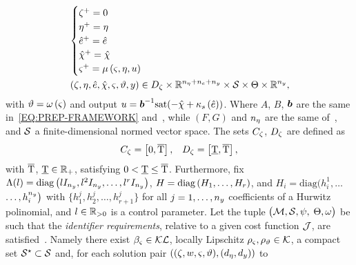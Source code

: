 \begin{equation*}
   \begin{split}
      &
      \begin{cases}
         \zeta^{+} = 0 \\
         \eta^{+} = \eta \\
         \hat{e}^{+} = \hat{e} \\
         \hat{\chi}^{+} = \hat{\chi}\\
         \varsigma^{+} = \mu \left( \varsigma, \eta, u \right)
      \end{cases} \\
      & \left( \zeta, \eta, \hat{e}, \hat{\chi}, \varsigma, \vartheta, y \right) \in D_{\zeta} \times \mathbb{R}^{n_{\eta} + n_{e} + n_{y}} \times \mathcal{S} \times \Theta \times \mathbb{R}^{n_{y}},
   \end{split}
\end{equation*}
with $\vartheta = \omega \left( \varsigma \right)$ and output $u = \boldsymbol{b}^{-1}\text{sat}(-\hat{\chi} + \kappa_s \left( \hat{e} \right))$.
Where $A$, $B$, $\boldsymbol{b}$ are the same in~\eqref{EQ:PREP-FRAMEWORK} and~,
while $(F,G)$ and $n_{\eta}$ are the same of~, and
$\mathcal{S}$ a finite-dimensional normed vector space. The sets $C_{\zeta}$, $D_{\zeta}$ are defined as
\begin{equation*}
   \begin{matrix}
      C_{\zeta} = \left[ 0, \overline{\text{T}} \right], &
      D_{\zeta} = \left[ \underline{\text{T}}, \overline{\text{T}} \right],
   \end{matrix}
\end{equation*}
with $\overline{\text{T}}$, $\underline{\text{T}} \in \mathbb{R}_{+}$, satisfying $0 < \underline{\text{T}} \le \overline{\text{T}}$.
Furthermore, fix $\Lambda(l) = \text{diag} \left( l I_{n_{y}}, l^{2} I_{n_{y}}, \dots, l^{r} I_{n_{y}} \right)$,
$H = \text{diag} \left( H_1, \dots, H_r \right)$, and $H_i = \text{diag} \big( h^1_i, \dots$ $\dots, h^{n_{y}}_i \big)$ with
$\{h_{1}^j, h_{2}^j, \dots, h_{r+1}^j\}$ for all $j = 1, \dots, n_{y}$ coefficients of a Hurwitz polinomial,
and $l \in \mathbb{R}_{>0}$ is a control parameter.
Let the tuple $\big(\mathcal{M}, \mathcal{S}, \psi,$ $\Theta, \omega \big)$ be such that the \emph{identifier requirements},
relative to a given cost function $\mathcal{J}$, are satisfied~\cite{bin2020approximate}.
Namely there exist $\beta_{\varsigma} \in \mathcal{KL}$, locally Lipschitz $\rho_{\varsigma}, \rho_{\vartheta} \in \mathcal{K}$, a compact set
$\mathcal{S}^{\star} \subset \mathcal{S}$ and, for each solution pair $((\zeta, w, \varsigma, \vartheta),(d_{\eta}, d_{y}))$ to

